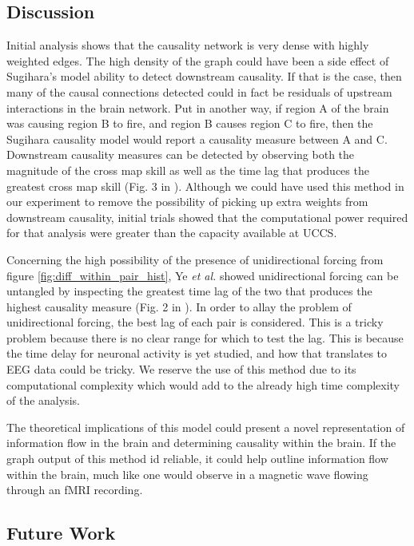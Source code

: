 \subsection{Discussion}
Initial analysis shows that the causality network is very dense with highly weighted edges. The high density of the graph could have been a side effect of Sugihara's model ability to detect downstream causality. If that is the case, then many of the causal connections detected could in fact be residuals of upstream interactions in the brain network. Put in another way, if region A of the brain was causing region B to fire, and region B causes region C to fire, then the Sugihara causality model would report a causality measure between A and C. Downstream causality measures can be detected by observing both the magnitude of the cross map skill as well as the time lag that produces the greatest cross map skill (Fig. 3 in \cite{Ye2015}). Although we could have used this method in our experiment to remove the possibility of picking up extra weights from downstream causality, initial trials showed that the computational power required for that analysis were greater than the capacity available at UCCS. 

Concerning the high possibility of the presence of unidirectional forcing from figure \ref{fig:diff_within_pair_hist}, Ye \textit{et al.} showed unidirectional forcing can be untangled by inspecting the greatest time lag of the two that produces the highest causality measure (Fig. 2 in \cite{Ye2015}). In order to allay the problem of unidirectional forcing, the best lag of each pair is considered. This is a tricky problem because there is no clear range for which to test the lag. This is because the time delay for neuronal activity is yet studied, and how that translates to EEG data could be tricky. We reserve the use of this method due to its computational complexity which would add to the already high time complexity of the analysis.

The theoretical implications of this model could present a novel representation of information flow in the brain and determining causality within the brain. If the graph output of this method id reliable, it could help outline information flow within the brain, much like one would observe in a magnetic wave flowing through an fMRI recording. 



\subsection{Future Work}

